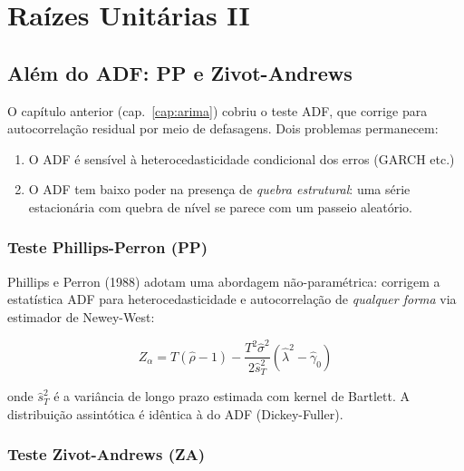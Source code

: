 \chapter{Raízes Unitárias II}
\label{cap:raiz_unitaria2}

\section{Além do ADF: PP e Zivot-Andrews}

O capítulo anterior (cap.~\ref{cap:arima}) cobriu o teste ADF, que corrige
para autocorrelação residual por meio de defasagens. Dois problemas permanecem:

\begin{enumerate}
  \item O ADF é sensível à heterocedasticidade condicional dos erros (GARCH etc.)
  \item O ADF tem baixo poder na presença de \emph{quebra estrutural}: uma série
        estacionária com quebra de nível se parece com um passeio aleatório.
\end{enumerate}

\subsection*{Teste Phillips-Perron (PP)}

Phillips e Perron (1988) adotam uma abordagem não-paramétrica: corrigem a
estatística ADF para heterocedasticidade e autocorrelação de \emph{qualquer
forma} via estimador de Newey-West:

\[
  Z_\alpha = T(\hat{\rho} - 1) - \frac{T^2 \hat{\sigma}^2}{2\hat{s}_T^2}(\hat{\lambda}^2 - \hat{\gamma}_0)
\]

onde $\hat{s}_T^2$ é a variância de longo prazo estimada com kernel de Bartlett.
A distribuição assintótica é idêntica à do ADF (Dickey-Fuller).

\subsection*{Teste Zivot-Andrews (ZA)}

